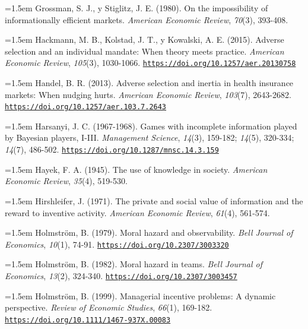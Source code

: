 \documentclass[10pt,a4paper]{article}
\begin{document}
\noindent\hangindent=1.5em Grossman, S. J., y Stiglitz, J. E. (1980). On the impossibility of informationally efficient markets. \textit{American Economic Review}, \textit{70}(3), 393-408.

\noindent\hangindent=1.5em Hackmann, M. B., Kolstad, J. T., y Kowalski, A. E. (2015). Adverse selection and an individual mandate: When theory meets practice. \textit{American Economic Review}, \textit{105}(3), 1030-1066. \href{https://doi.org/10.1257/aer.20130758}{\nolinkurl{https://doi.org/10.1257/aer.20130758}}

\noindent\hangindent=1.5em Handel, B. R. (2013). Adverse selection and inertia in health insurance markets: When nudging hurts. \textit{American Economic Review}, \textit{103}(7), 2643-2682. \href{https://doi.org/10.1257/aer.103.7.2643}{\nolinkurl{https://doi.org/10.1257/aer.103.7.2643}}

\noindent\hangindent=1.5em Harsanyi, J. C. (1967-1968). Games with incomplete information played by Bayesian players, I-III. \textit{Management Science}, \textit{14}(3), 159-182; \textit{14}(5), 320-334; \textit{14}(7), 486-502. \href{https://doi.org/10.1287/mnsc.14.3.159}{\nolinkurl{https://doi.org/10.1287/mnsc.14.3.159}}

\noindent\hangindent=1.5em Hayek, F. A. (1945). The use of knowledge in society. \textit{American Economic Review}, \textit{35}(4), 519-530.

\noindent\hangindent=1.5em Hirshleifer, J. (1971). The private and social value of information and the reward to inventive activity. \textit{American Economic Review}, \textit{61}(4), 561-574.

\noindent\hangindent=1.5em Holmström, B. (1979). Moral hazard and observability. \textit{Bell Journal of Economics}, \textit{10}(1), 74-91. \href{https://doi.org/10.2307/3003320}{\nolinkurl{https://doi.org/10.2307/3003320}}

\noindent\hangindent=1.5em Holmström, B. (1982). Moral hazard in teams. \textit{Bell Journal of Economics}, \textit{13}(2), 324-340. \href{https://doi.org/10.2307/3003457}{\nolinkurl{https://doi.org/10.2307/3003457}}

\noindent\hangindent=1.5em Holmström, B. (1999). Managerial incentive problems: A dynamic perspective. \textit{Review of Economic Studies}, \textit{66}(1), 169-182. \href{https://doi.org/10.1111/1467-937X.00083}{\nolinkurl{https://doi.org/10.1111/1467-937X.00083}}
\end{document}

